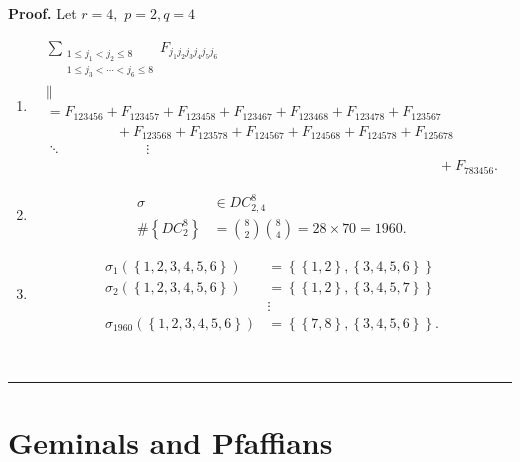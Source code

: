 \documentclass[aps,preprint]{revtex4}%
\newenvironment{proof}[1][Proof]{\noindent\textbf{#1.} }{\ \rule{0.5em}{0.5em}}
\begin{document}
\begin{proof}
Let $r=4,$ $p=2,q=4$

\begin{enumerate}
\item
\begin{gather}
\sum_{\substack{1\leq j_{1}<j_{2}\leq8\\1\leq j_{3}<\cdots<j_{6}\leq
8}}F_{j_{1}j_{2}j_{3}j_{4}j_{5}j_{6}}\\
\parallel\\
=F_{123456}+F_{123457}+F_{123458}+F_{123467}+F_{123468}+F_{123478}%
+F_{123567}\\
\qquad\qquad\quad+F_{123568}+F_{123578}+F_{124567}+F_{124568}+F_{124578}%
+F_{125678}\\
\ddots\qquad\qquad\qquad\vdots\\
\qquad\qquad\qquad\qquad\qquad\qquad\qquad\qquad\qquad\qquad\qquad\qquad
\qquad\qquad+F_{783456}.
\end{gather}


\item
\begin{align}
\sigma &  \in DC_{2,4}^{8}\\
\#\left\{  DC_{2}^{8}\right\}   &  =\binom{8}{2}\binom{8}{4}=28\times70=1960.
\end{align}


\item
\begin{align}
\sigma_{1}\left(  \left\{  1,2,3,4,5,6\right\}  \right)   &  =\left\{
\left\{  1,2\right\}  ,\left\{  3,4,5,6\right\}  \right\} \\
\sigma_{2}\left(  \left\{  1,2,3,4,5,6\right\}  \right)   &  =\left\{
\left\{  1,2\right\}  ,\left\{  3,4,5,7\right\}  \right\} \\
&  \vdots\\
\sigma_{1960}\left(  \left\{  1,2,3,4,5,6\right\}  \right)   &  =\left\{
\left\{  7,8\right\}  ,\left\{  3,4,5,6\right\}  \right\}  .
\end{align}

\end{enumerate}
\end{proof}

\section{Geminals and Pfaffians}

\label{06/29/2025}
\end{document}
